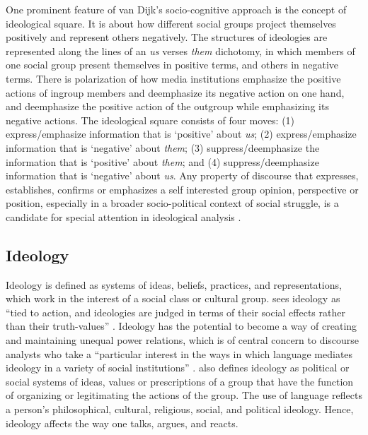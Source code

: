 \documentclass[output=paper,modfonts]{langscibook}
\begin{document}
One prominent feature of van Dijk’s socio-cognitive approach is the concept of ideological square. It is about how different social groups project themselves positively and represent others negatively. The structures of ideologies are represented along the lines of an \textit{us} verses \textit{them} dichotomy, in which members of one social group present themselves in positive terms, and others in negative terms. There is polarization of how media institutions emphasize the positive actions of ingroup members and deemphasize its negative action on one hand, and deemphasize the positive action of the outgroup while emphasizing its negative actions. The ideological square consists of four moves: (1) express/emphasize information that is ‘positive’ about \textit{us}; (2) express/emphasize information that is ‘negative’ about \textit{them}; (3) suppress/deemphasize the information that is ‘positive’ about \textit{them}; and (4) suppress/deemphasize information that is ‘negative’ about \textit{us}. Any property of discourse that expresses, establishes, confirms or emphasizes a self interested group opinion, perspective or position, especially in a broader socio-political context of social struggle, is a candidate for special attention in ideological analysis \citep{vanDijk1998}. 

\subsection{Ideology}\label{sec:ofori:2.3}

Ideology is defined as systems of ideas, beliefs, practices, and representations, which work in the interest of a social class or cultural group. \citeauthor{Gramsci1971} sees ideology as “tied to action, and ideologies are judged in terms of their social effects rather than their truth-values” \citep[76]{Fairclough1995}. Ideology has the potential to become a way of creating and maintaining unequal power relations, which is of central concern to discourse analysts who take a “particular interest in the ways in which language mediates ideology in a variety of social institutions” \citep[10]{Wodak2001}. \citet[3]{vanDijk1998} also defines ideology as political or social systems of ideas, values or prescriptions of a group that have the function of organizing or legitimating the actions of the group. The use of language reflects a person’s philosophical, cultural, religious, social, and political ideology. Hence, ideology affects the way one talks, argues, and reacts. 
\end{document}
